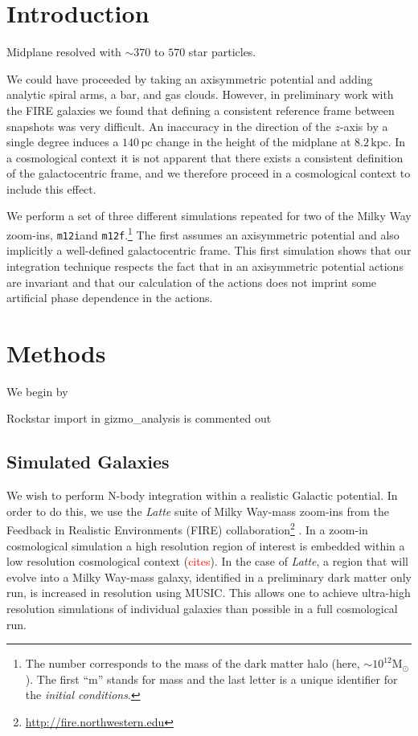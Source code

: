 \documentclass[twocolumn]{aastex62}
\newcommand{\Gus}[1]{\textcolor{red}{#1}}
\newcommand{\Msun}{\text{M}_\odot}
\newcommand{\pc}{\text{pc}}
\newcommand{\kpc}{\text{kpc}}
\newcommand{\mi}{\texttt{m12i}}
\newcommand{\mf}{\texttt{m12f}}
\begin{document}

\section{Introduction} \label{sec:intro}


Midplane resolved with $\sim 370$ to $570$ star particles.

We could have proceeded by taking an axisymmetric potential and adding
analytic spiral arms, a bar, and gas clouds. However, in preliminary work
with the FIRE galaxies we found that defining a consistent reference frame
between snapshots was very difficult. An inaccuracy in the direction of the
$z$-axis by a single degree induces a $140\,\pc$ change in the height of the
midplane at $8.2\,\kpc$. In a cosmological context it is not apparent that
there exists a consistent definition of the galactocentric frame, and we
therefore proceed in a cosmological context to include this effect.

We perform a set of three different simulations repeated for two of the Milky
Way zoom-ins, \mi and \mf.\footnote{The number corresponds to the mass of the
dark matter halo (here, $\sim 10^{12} \Msun$). The first ``m'' stands for
mass and the last letter is a unique identifier for the {\em initial
conditions}.} The first assumes an axisymmetric potential and also implicitly
a well-defined galactocentric frame. This first simulation shows that our
integration technique respects the fact that in an axisymmetric potential
actions are invariant and that our calculation of the actions does not
imprint some artificial phase dependence in the actions.


\section{Methods} \label{sec:methods}
We begin by 

Rockstar import in gizmo\_analysis is commented out

\subsection{Simulated Galaxies} \label{ssec:fire}
We wish to perform N-body integration within a realistic Galactic potential.
In order to do this, we use the {\em Latte} suite of Milky Way-mass zoom-ins
from the Feedback in Realistic Environments (FIRE)
collaboration\footnote{\url{http://fire.northwestern.edu}}
\citep{2016ApJ...827L..23W,2018MNRAS.480..800H}. In a zoom-in cosmological
simulation a high resolution region of interest is embedded within a low
resolution cosmological context (\Gus{cites}). In the case of {\em Latte}, a
region that will evolve into a Milky Way-mass galaxy, identified in a
preliminary dark matter only run, is increased in resolution using MUSIC.
This allows one to achieve ultra-high resolution simulations of individual
galaxies than possible in a full cosmological run.
\end{document}
